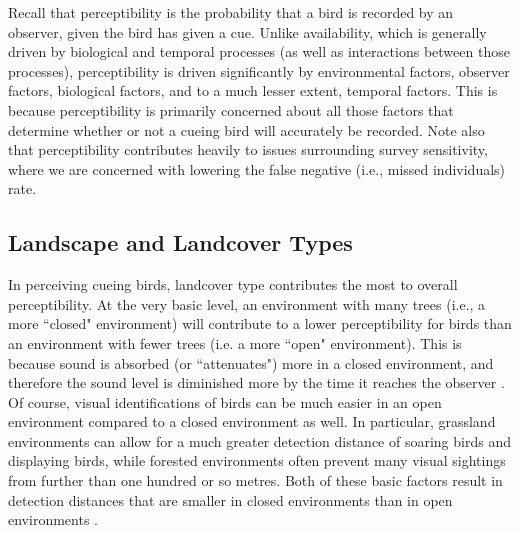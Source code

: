 \par Recall that perceptibility is the probability that a bird is recorded by an observer, given the bird has given a cue.
Unlike availability, which is generally driven by biological and temporal processes (as well as interactions between those processes), perceptibility is driven significantly by environmental factors, observer factors, biological factors, and to a much lesser extent, temporal factors.
This is because perceptibility is primarily concerned about all those factors that determine whether or not a cueing bird will accurately be recorded.
Note also that perceptibility contributes heavily to issues surrounding survey sensitivity, where we are concerned with lowering the false negative (i.e., missed individuals) rate.

\subsection{Landscape and Landcover Types}

\par In perceiving cueing birds, landcover type contributes the most to overall perceptibility.
At the very basic level, an environment with many trees (i.e., a more ``closed" environment) will contribute to a lower perceptibility for birds than an environment with fewer trees (i.e. a more ``open" environment).
This is because sound is absorbed (or ``attenuates") more in a closed environment, and therefore the sound level is diminished more by the time it reaches the observer \citep{yip_sound_2017}.
Of course, visual identifications of birds can be much easier in an open environment compared to a closed environment as well.
In particular, grassland environments can allow for a much greater detection distance of soaring birds and displaying birds, while forested environments often prevent many visual sightings from further than one hundred or so metres.
Both of these basic factors result in detection distances that are smaller in closed environments than in open environments \citep{edwards_point_2023, solymos_calibrating_2013, yip_sound_2017}.

